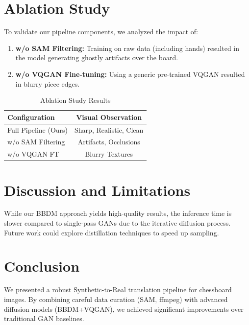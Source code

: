 \documentclass[12pt,a4paper]{article}
\begin{document}
\section{Ablation Study}
\label{sec:ablation}

To validate our pipeline components, we analyzed the impact of:
\begin{enumerate}
    \item \textbf{w/o SAM Filtering:} Training on raw data (including hands) resulted in the model generating ghostly artifacts over the board.
    \item \textbf{w/o VQGAN Fine-tuning:} Using a generic pre-trained VQGAN resulted in blurry piece edges.
\end{enumerate}

\begin{table}[ht]
\centering
\caption{Ablation Study Results}
\begin{tabular}{lc}
\toprule
\textbf{Configuration} & \textbf{Visual Observation} \\
\midrule
Full Pipeline (Ours) & Sharp, Realistic, Clean \\
w/o SAM Filtering & Artifacts, Occlusions \\
w/o VQGAN FT & Blurry Textures \\
\bottomrule
\end{tabular}
\end{table}

\section{Discussion and Limitations}
While our BBDM approach yields high-quality results, the inference time is slower compared to single-pass GANs due to the iterative diffusion process. Future work could explore distillation techniques to speed up sampling.

\section{Conclusion}
We presented a robust Synthetic-to-Real translation pipeline for chessboard images. By combining careful data curation (SAM, ffmpeg) with advanced diffusion models (BBDM+VQGAN), we achieved significant improvements over traditional GAN baselines.




\end{document}
